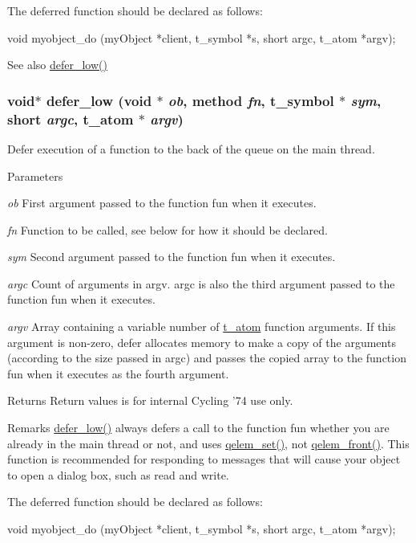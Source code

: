 The deferred function should be declared as follows: 
\begin{DoxyCode}
    void myobject_do (myObject *client, t_symbol *s, short argc, t_atom *argv);
\end{DoxyCode}


\begin{DoxySeeAlso}{See also}
\hyperlink{group__threading_ga486daa40ddb16f70b663615695d18315}{defer\_\-low()} 
\end{DoxySeeAlso}
\hypertarget{group__threading_ga486daa40ddb16f70b663615695d18315}{
\subsubsection[{defer\_\-low}]{\setlength{\rightskip}{0pt plus 5cm}void$\ast$ defer\_\-low (void $\ast$ {\em ob}, \/  {\bf method} {\em fn}, \/  {\bf t\_\-symbol} $\ast$ {\em sym}, \/  short {\em argc}, \/  {\bf t\_\-atom} $\ast$ {\em argv})}}
\label{group__threading_ga486daa40ddb16f70b663615695d18315}


Defer execution of a function to the back of the queue on the main thread. 
\begin{DoxyParams}{Parameters}
\item[{\em ob}]First argument passed to the function fun when it executes. \item[{\em fn}]Function to be called, see below for how it should be declared. \item[{\em sym}]Second argument passed to the function fun when it executes. \item[{\em argc}]Count of arguments in argv. argc is also the third argument passed to the function fun when it executes. \item[{\em argv}]Array containing a variable number of \hyperlink{structt__atom}{t\_\-atom} function arguments. If this argument is non-\/zero, defer allocates memory to make a copy of the arguments (according to the size passed in argc) and passes the copied array to the function fun when it executes as the fourth argument. \end{DoxyParams}
\begin{DoxyReturn}{Returns}
Return values is for internal Cycling '74 use only.
\end{DoxyReturn}
\begin{DoxyRemark}{Remarks}
\hyperlink{group__threading_ga486daa40ddb16f70b663615695d18315}{defer\_\-low()} always defers a call to the function fun whether you are already in the main thread or not, and uses \hyperlink{group__qelems_ga3e292aad133af89a87e167e88cc4a1b5}{qelem\_\-set()}, not \hyperlink{group__qelems_gab5fa3e43e7851d1a2049ee28f5275955}{qelem\_\-front()}. This function is recommended for responding to messages that will cause your object to open a dialog box, such as read and write.
\end{DoxyRemark}
The deferred function should be declared as follows: 
\begin{DoxyCode}
    void myobject_do (myObject *client, t_symbol *s, short argc, t_atom *argv);
\end{DoxyCode}


